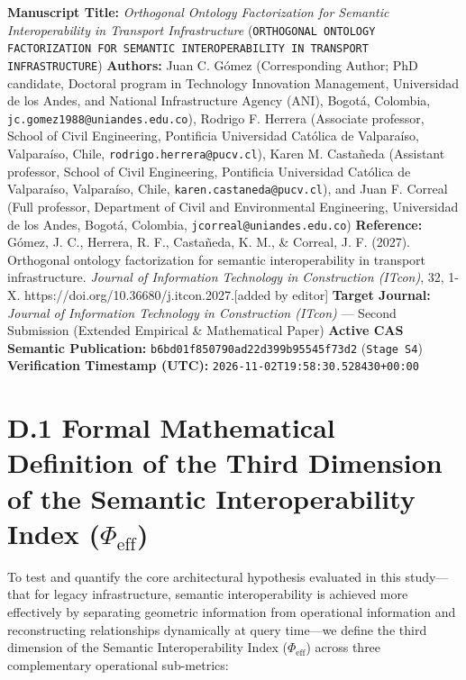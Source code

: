 \documentclass[10pt,a4paper]{article}
\begin{document}
\textbf{Manuscript Title:} \textit{Orthogonal Ontology Factorization for Semantic Interoperability in Transport Infrastructure} (\texttt{ORTHOGONAL ONTOLOGY FACTORIZATION FOR SEMANTIC INTEROPERABILITY IN TRANSPORT INFRASTRUCTURE})
\textbf{Authors:} Juan C. Gómez (Corresponding Author; PhD candidate, Doctoral program in Technology Innovation Management, Universidad de los Andes, and National Infrastructure Agency (ANI), Bogotá, Colombia, \texttt{jc.gomez1988@uniandes.edu.co}), Rodrigo F. Herrera (Associate professor, School of Civil Engineering, Pontificia Universidad Católica de Valparaíso, Valparaíso, Chile, \texttt{rodrigo.herrera@pucv.cl}), Karen M. Castañeda (Assistant professor, School of Civil Engineering, Pontificia Universidad Católica de Valparaíso, Valparaíso, Chile, \texttt{karen.castaneda@pucv.cl}), and Juan F. Correal (Full professor, Department of Civil and Environmental Engineering, Universidad de los Andes, Bogotá, Colombia, \texttt{jcorreal@uniandes.edu.co})
\textbf{Reference:} Gómez, J. C., Herrera, R. F., Castañeda, K. M., \& Correal, J. F. (2027). Orthogonal ontology factorization for semantic interoperability in transport infrastructure. \textit{Journal of Information Technology in Construction (ITcon)}, 32, 1-X. https://doi.org/10.36680/j.itcon.2027.[added by editor]
\textbf{Target Journal:} \textit{Journal of Information Technology in Construction (ITcon)} --- Second Submission (Extended Empirical \& Mathematical Paper)
\textbf{Active CAS Semantic Publication:} \texttt{b6bd01f850790ad22d399b95545f73d2} (\texttt{Stage S4})
\textbf{Verification Timestamp (UTC):} \texttt{2026-11-02T19:58:30.528430+00:00}



\section*{D.1 Formal Mathematical Definition of the Third Dimension of the Semantic Interoperability Index ($\Phi_{\text{eff}}$)}

To test and quantify the core architectural hypothesis evaluated in this study---that for legacy infrastructure, semantic interoperability is achieved more effectively by separating geometric information from operational information and reconstructing relationships dynamically at query time---we define the third dimension of the Semantic Interoperability Index ($\Phi_{\text{eff}}$) across three complementary operational sub-metrics:
\end{document}
